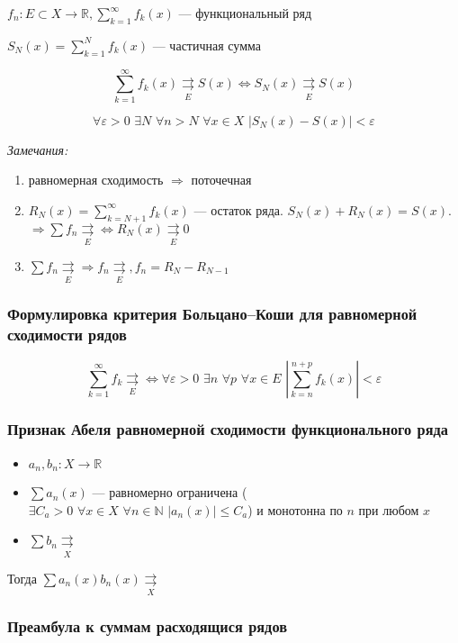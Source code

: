 \documentclass{article}
\def\dbl{\,\,}
\def\rsh#1{\underset{#1}{\rightrightarrows}}
\def\rshe{\rsh{E}}
\begin{document}
$f_n: E \subset X \rightarrow \mathbb{R}, \sum_{k = 1}^{\infty} f_k(x)$ --- функциональный ряд

$S_N(x) = \sum_{k = 1}^N f_k(x)$ --- частичная сумма

\[\sum_{k = 1}^{\infty} f_k(x) \rsh{E} S(x) \Leftrightarrow S_N(x) \rshe S(x)\]

\[\forall \varepsilon > 0 \dbl \exists N \dbl \forall n > N \dbl \forall x \in X \dbl \left|S_N(x) - S(x)\right| < \varepsilon\]

\textit{Замечания:}

\begin{enumerate}
    \item равномерная сходимость $\Rightarrow$ поточечная
    \item $R_N(x) = \sum_{k = N + 1}^{\infty} f_k(x)$ --- остаток ряда. $S_N(x) + R_N(x) = S(x)$. $\Rightarrow \sum f_n \rshe \Leftrightarrow R_N(x) \rshe 0$
    \item $\sum f_n \rshe \Rightarrow f_n \rshe, f_n = R_{N} - R_{N - 1}$
\end{enumerate}

\subsubsection{Формулировка критерия Больцано--Коши для равномерной сходимости рядов}

\[\sum_{k = 1}^{\infty} f_k \rshe \Leftrightarrow \forall \varepsilon > 0 \dbl \exists n \dbl \forall p \dbl \forall x \in E \dbl \left|\sum_{k = n}^{n + p} f_k(x)\right| < \varepsilon \]

\subsubsection{Признак Абеля равномерной сходимости функционального ряда}

\begin{itemize}
    \item $a_n, b_n: X \rightarrow \mathbb{R}$
    \item $\sum a_n(x)$ --- равномерно ограничена ($\exists C_a > 0 \dbl \forall x \in X \dbl \forall n \in \mathbb{N} \dbl |a_n(x)| \le C_a$) и монотонна по $n$ при любом $x$
    \item $\sum b_n \rsh{X}$
\end{itemize}

Тогда $\sum a_n(x) b_n(x) \rsh{X}$

\subsubsection{Преамбула к суммам расходящися рядов}
\end{document}
